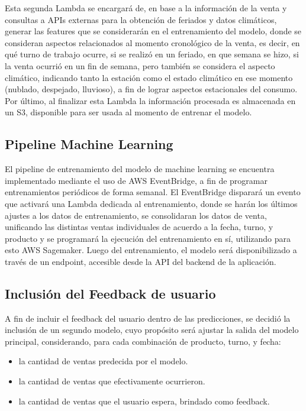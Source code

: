 Esta segunda Lambda se encargará de, en base a la información de la venta y consultas a APIs externas para la obtención de feriados y datos climáticos, generar las features que se considerarán en el entrenamiento del modelo, donde se consideran aspectos relacionados al momento cronológico de la venta, es decir, en qué turno de trabajo ocurre, si se realizó en un feriado, en que semana se hizo, si la venta ocurrió en un fin de semana, pero también se considera el aspecto climático, indicando tanto la estación como el estado climático en ese momento (nublado, despejado, lluvioso), a fin de lograr aspectos estacionales del consumo.
Por último, al finalizar esta Lambda la información procesada es almacenada en un S3, disponible para ser usada al momento de entrenar el modelo.


\subsection{Pipeline Machine Learning}\label{sec:pipeline-machine-learning}

El pipeline de entrenamiento del modelo de machine learning se encuentra implementado mediante el uso de AWS EventBridge, a fin de programar entrenamientos periódicos de forma semanal. El EventBridge disparará un evento que activará una Lambda dedicada al entrenamiento, donde se harán los últimos ajustes a los datos de entrenamiento, se consolidaran los datos de venta, unificando las distintas ventas individuales de acuerdo a la fecha, turno, y producto y se programará la ejecución del entrenamiento en sí, utilizando para esto AWS Sagemaker. Luego del entrenamiento, el modelo será disponibilizado a través de un endpoint, accesible desde la API del backend de la aplicación.

\subsection{Inclusión del Feedback de usuario}\label{sec:inclusion-feedback-usuario}

A fin de incluir el feedback del usuario dentro de las predicciones, se decidió la inclusión de un segundo modelo, cuyo propósito será ajustar la salida del modelo principal, considerando, para cada combinación de producto, turno, y fecha: 

\begin{itemize}
    \item la cantidad de ventas predecida por el modelo.
    \item la cantidad de ventas que efectivamente ocurrieron.
    \item la cantidad de ventas que el usuario espera, brindado como feedback.
\end{itemize}

